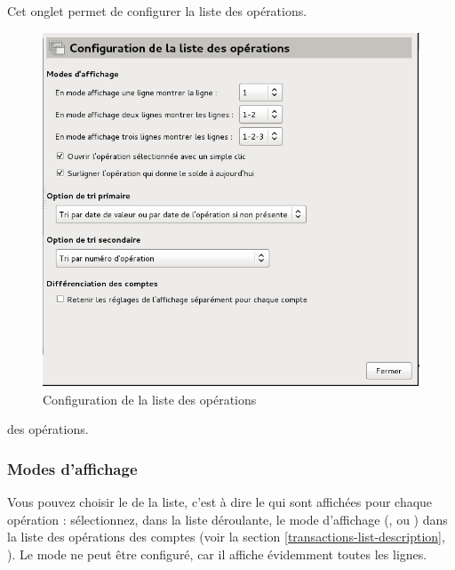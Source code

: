 Cet onglet permet de configurer la liste \ifIllustration des opérations.
\begin{figure}[ht]
\begin{center}
\includegraphics[scale=0.5]{image/screenshot/setup_listBehaviour}
\end{center}
\caption{Configuration de la liste des opérations}
\label{setup-listBehaviour-img}
\end{figure}
\else des opérations.
\fi


\subsubsection{Modes d'affichage\label{setup-operations-list-modes}}

Vous pouvez choisir le  de la liste, c'est à dire le  qui sont affichées pour chaque opération : sélectionnez, dans la liste déroulante, le mode d'affichage (,  ou ) dans la liste des opérations des comptes (voir la section \vref{transactions-list-description}, ). Le mode  ne peut être configuré, car il affiche évidemment toutes les lignes.

